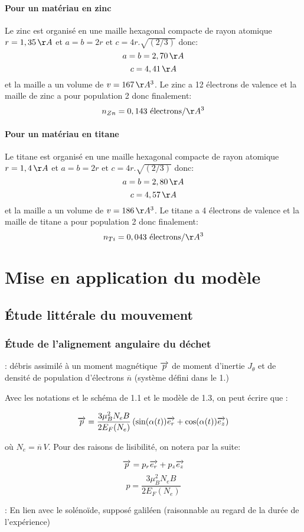 \documentclass{report}
\begin{document}
\subsubsection{Pour un matériau en zinc}
Le zinc est organisé en une maille hexagonal compacte de rayon atomique $r=1,35 \,\AA$ et $a = b = 2r \mbox{ et }c = 4r.\sqrt{(2 / 3)}$ donc:
$$a=b=2,70\,\AA$$
$$c=4,41\,\AA$$
et la maille a un volume de $v = 167\,\AA^3$. Le zinc a 12 électrons de valence et la maille de zinc a pour population 2 donc finalement:
$$n_{Zn} = 0,143 \text{ électrons} / \AA^3$$
\subsubsection{Pour un matériau en titane}
Le titane est organisé en une maille hexagonal compacte de rayon atomique $r=1,4 \,\AA$ et $a = b = 2r \mbox{ et }c = 4r.\sqrt{(2 / 3)}$ donc:
$$a=b=2,80\,\AA$$
$$c=4,57\,\AA$$
et la maille a un volume de $v = 186\,\AA^3$. Le titane a 4 électrons de valence et la maille de titane a pour population 2 donc finalement:
$$n_{Ti} = 0,043 \text{ électrons} / \AA^3$$

\chapter{Mise en application du modèle}
\section{Étude littérale du mouvement}
\subsection{Étude de l'alignement angulaire du déchet}

: {débris assimilé à un moment magnétique $\overrightarrow{p}$ de moment d'inertie $J_\theta$ et de densité de population d'électrons $\overline{n}$ (système défini dans le 1.)}

Avec les notations et le schéma de 1.1 et le modèle de 1.3, on peut écrire que :

$$\overrightarrow{p} = \frac{3\mu_B^2 N_e B}{2 E_F(N_e)} \left(\sin(\alpha(t)) \overrightarrow{e_r} + \cos(\alpha(t)) \overrightarrow{e_z}\right) $$

où $N_e = \overline{n}\, V$. Pour des raisons de lisibilité, on notera par la suite:

$$\overrightarrow{p} = p_r \overrightarrow{e_r} + p_z \overrightarrow{e_z}$$
$$p = \frac{3\mu_B^2 N_e B}{2 E_F(N_e)}$$

: En lien avec le solénoïde, supposé galiléen (raisonnable au regard de la durée de l'expérience)
\end{document}
